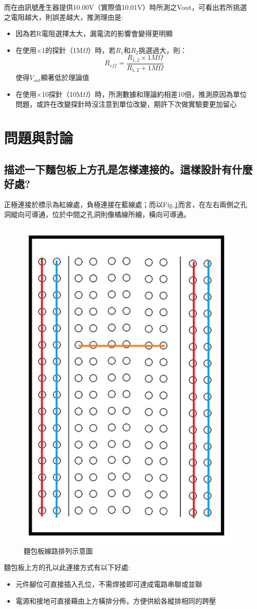 \documentclass[12pt,a4paper]{article}
\begin{document}
\begin{CJK}{UTF8}{bkai}
而在由訊號產生器提供10.00V（實際值10.01V）時所測之Vout，可看出若所挑選之電阻越大，則誤差越大，推測理由是:
\begin{itemize}
    \item 因為若R電阻選擇太大，漏電流的影響會變得更明顯
    \item 在使用$\times$1的探針（1M$\Omega$）時，若$R_{1}$和$R_{2}$挑選過大，則：
    \begin{equation}
        R_{eff} = \frac{R_{1,2}\times1M\Omega}{R_{1,2}+1M\Omega}
    \end{equation}
    使得$V_{out}$顯著低於理論值
    \item 在使用$\times$10探針（10M$\Omega$）時，所測數據和理論約相差10倍，推測原因為單位問題，或許在改變探針時沒注意到單位改變，期許下次做實驗要更加留心
\end{itemize}



\clearpage

\section{問題與討論}

\subsection{描述一下麵包板上方孔是怎樣連接的。這樣設計有什麼好處?}\label{subsec:1}
\hfill

正極連接於標示為紅線處，負極連接在藍線處；而以Fig.\ref{fig:bread}而言，在左右兩側之孔洞縱向可導通，位於中間之孔洞則像橘線所繪，橫向可導通。
\begin{figure}[h]
    \centering
    \includegraphics[width=0.25\linewidth]{figures/bread.png}
    \caption{麵包板線路排列示意圖}
    \label{fig:bread}
\end{figure}
\newline
    麵包板上方的孔以此連接方式有以下好處:
    \begin{itemize}
        \item 元件腳位可直接插入孔位，不需焊接即可達成電路串聯或並聯
        \item 電源和接地可直接藉由上方橫排分佈，方便供給各縱排相同的跨壓
    \end{itemize}


\end{CJK}
\end{document}
